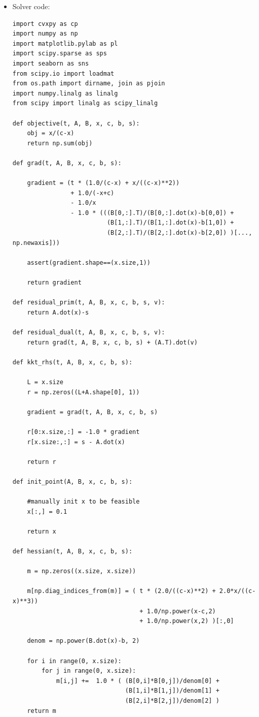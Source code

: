 \documentclass[12pt,letter]{article}
\begin{document}
\begin{enumerate}
\begin{itemize}
  \pagebreak
  
  \item Solver code:\\
\begin{Verbatim}[fontsize=\small]
import cvxpy as cp
import numpy as np
import matplotlib.pylab as pl
import scipy.sparse as sps
import seaborn as sns
from scipy.io import loadmat
from os.path import dirname, join as pjoin
import numpy.linalg as linalg
from scipy import linalg as scipy_linalg

def objective(t, A, B, x, c, b, s):
    obj = x/(c-x)
    return np.sum(obj)

def grad(t, A, B, x, c, b, s):
    
    gradient = (t * (1.0/(c-x) + x/((c-x)**2))
                + 1.0/(-x+c)
                - 1.0/x
                - 1.0 * (((B[0,:].T)/(B[0,:].dot(x)-b[0,0]) + 
                          (B[1,:].T)/(B[1,:].dot(x)-b[1,0]) +
                          (B[2,:].T)/(B[2,:].dot(x)-b[2,0]) )[..., np.newaxis]))

    assert(gradient.shape==(x.size,1))
    
    return gradient

def residual_prim(t, A, B, x, c, b, s, v):
    return A.dot(x)-s

def residual_dual(t, A, B, x, c, b, s, v):
    return grad(t, A, B, x, c, b, s) + (A.T).dot(v)

def kkt_rhs(t, A, B, x, c, b, s):
    
    L = x.size
    r = np.zeros((L+A.shape[0], 1))

    gradient = grad(t, A, B, x, c, b, s)

    r[0:x.size,:] = -1.0 * gradient
    r[x.size:,:] = s - A.dot(x)

    return r

def init_point(A, B, x, c, b, s):
    
    #manually init x to be feasible
    x[:,] = 0.1

    return x

def hessian(t, A, B, x, c, b, s):

    m = np.zeros((x.size, x.size))

    m[np.diag_indices_from(m)] = ( t * (2.0/((c-x)**2) + 2.0*x/((c-x)**3))
                                   + 1.0/np.power(x-c,2)
                                   + 1.0/np.power(x,2) )[:,0]

    denom = np.power(B.dot(x)-b, 2)
    
    for i in range(0, x.size):
        for j in range(0, x.size):
            m[i,j] +=  1.0 * ( (B[0,i]*B[0,j])/denom[0] +
                               (B[1,i]*B[1,j])/denom[1] +
                               (B[2,i]*B[2,j])/denom[2] )
    return m
    

\end{Verbatim}
\end{itemize}
\end{enumerate}
\end{document}
